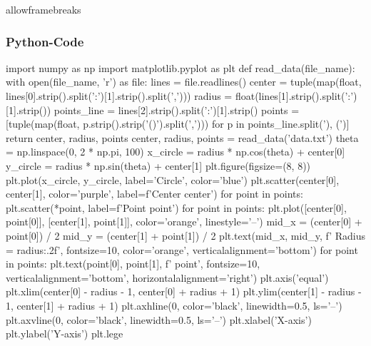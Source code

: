 \documentclass{beamer}
\begin{document}
\begin{frame}{allowframebreaks}
\frametitle{Python-Code}
import numpy as np
import matplotlib.pyplot as plt
def read_data(file_name):
    with open(file_name, 'r') as file:
        lines = file.readlines()
    center = tuple(map(float, lines[0].strip().split(':')[1].strip().split(',')))
    radius = float(lines[1].strip().split(':')[1].strip())
    points_line = lines[2].strip().split(':')[1].strip()
    points = [tuple(map(float, p.strip().strip('()').split(','))) for p in points_line.split('), (')]
    return center, radius, points
center, radius, points = read_data('data.txt')
theta = np.linspace(0, 2 * np.pi, 100)
x_circle = radius * np.cos(theta) + center[0]
y_circle = radius * np.sin(theta) + center[1]
plt.figure(figsize=(8, 8))
plt.plot(x_circle, y_circle, label='Circle', color='blue')
plt.scatter(center[0], center[1], color='purple', label=f'Center {center}')
for point in points:
    plt.scatter(*point, label=f'Point {point}')
for point in points:
    plt.plot([center[0], point[0]], [center[1], point[1]], color='orange', linestyle='--')
    mid_x = (center[0] + point[0]) / 2
    mid_y = (center[1] + point[1]) / 2
    plt.text(mid_x, mid_y, f' Radius = {radius:.2f}', fontsize=10, color='orange', verticalalignment='bottom')
for point in points:
    plt.text(point[0], point[1], f'  {point}', fontsize=10, verticalalignment='bottom', horizontalalignment='right')
plt.axis('equal')
plt.xlim(center[0] - radius - 1, center[0] + radius + 1)
plt.ylim(center[1] - radius - 1, center[1] + radius + 1)
plt.axhline(0, color='black', linewidth=0.5, ls='--')
plt.axvline(0, color='black', linewidth=0.5, ls='--')
plt.xlabel('X-axis')
plt.ylabel('Y-axis')
plt.lege
\end{frame}
\end{document}
